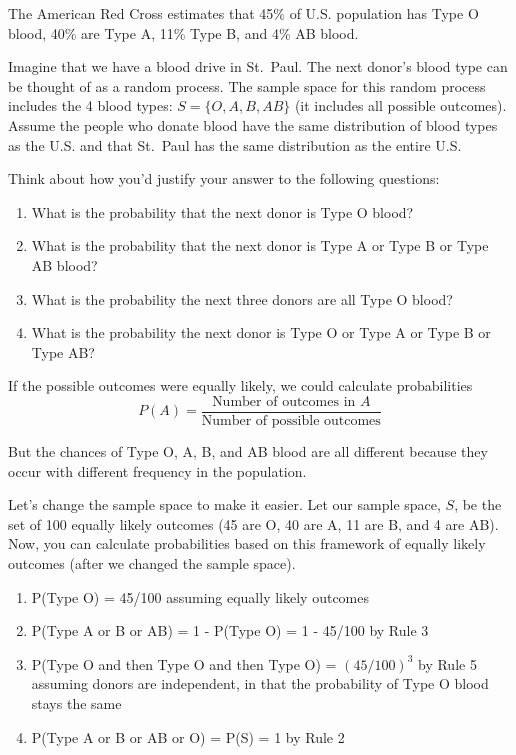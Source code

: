 \documentclass[]{book}
\begin{document}
The American Red Cross estimates that 45\% of U.S. population has Type O blood, 40\% are Type A, 11\% Type B, and 4\% AB blood.

Imagine that we have a blood drive in St.~Paul. The next donor's blood type can be thought of as a random process. The sample space for this random process includes the 4 blood types: \(S= \{O,A,B,AB\}\) (it includes all possible outcomes). Assume the people who donate blood have the same distribution of blood types as the U.S. and that St.~Paul has the same distribution as the entire U.S.

Think about how you'd justify your answer to the following questions:

\begin{enumerate}
\def\labelenumi{\arabic{enumi}.}
\item
  What is the probability that the next donor is Type O blood?
\item
  What is the probability that the next donor is Type A or Type B or Type AB blood?
\item
  What is the probability the next three donors are all Type O blood?
\item
  What is the probability the next donor is Type O or Type A or Type B or Type AB?
\end{enumerate}

If the possible outcomes were equally likely, we could calculate probabilities
\[P(A) = \frac{\text{Number of outcomes in }A}{\text{Number of possible outcomes}}\]

But the chances of Type O, A, B, and AB blood are all different because they occur with different frequency in the population.

Let's change the sample space to make it easier. Let our sample space, \(S\), be the set of 100 equally likely outcomes (45 are O, 40 are A, 11 are B, and 4 are AB). Now, you can calculate probabilities based on this framework of equally likely outcomes (after we changed the sample space).

\begin{enumerate}
\def\labelenumi{\arabic{enumi}.}
\item
  P(Type O) = 45/100 assuming equally likely outcomes
\item
  P(Type A or B or AB) = 1 - P(Type O) = 1 - 45/100 by Rule 3
\item
  P(Type O and then Type O and then Type O) = \((45/100)^3\) by Rule 5 assuming donors are independent, in that the probability of Type O blood stays the same
\item
  P(Type A or B or AB or O) = P(S) = 1 by Rule 2
\end{enumerate}
\end{document}
